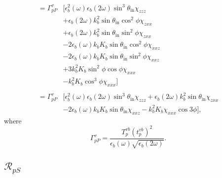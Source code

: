 \begin{equation*}
\begin{split}
= \Gamma^{v}_{pP}&\big[
    \epsilon^{2}_{b}(\omega)\epsilon_{b}
    (2\omega)\sin^{3}\theta_{\mathrm{in}}\chi_{zzz}\\
&+  \epsilon_{b}(2\omega)k^{2}_{b}
    \sin\theta_{\mathrm{in}}\cos^{2}\phi\chi_{zxx}\\
&+  \epsilon_{b}(2\omega)k^{2}_{b}
    \sin\theta_{\mathrm{in}}\sin^{2}\phi\chi_{zxx}\\
&- 2\epsilon_{b}(\omega)k_{b}K_{b}
    \sin\theta_{\mathrm{in}}\cos^{2}\phi\chi_{xxz}\\
&- 2\epsilon_{b}(\omega)k_{b}K_{b}
    \sin\theta_{\mathrm{in}}\sin^{2}\phi\chi_{xxz}\\
&+ 3k^{2}_{b}K_{b}\sin^{2}\phi\cos\phi\chi_{xxx}\\
&-  k^{2}_{b}K_{b}\cos^{3}\phi\chi_{xxx}
\big]\\\\
= \Gamma^{v}_{pP}&\big[
    \epsilon^{2}_{b}(\omega)\epsilon_{b}(2\omega)
    \sin^{3}\theta_{\mathrm{in}}\chi_{zzz}
 +  \epsilon_{b}(2\omega)k^{2}_{b}\sin\theta_{\mathrm{in}}\chi_{zxx}\\
&- 2\epsilon_{b}(\omega)k_{b}K_{b}\sin\theta_{\mathrm{in}}\chi_{xxz}
 -  k^{2}_{b}K_{b}\chi_{xxx}\cos3\phi
\big],
\end{split}
\end{equation*}
where
\begin{equation*}
\Gamma^{v}_{pP} =
\frac{T^{v b}_{p}\left(t^{v b}_{p}\right)^{2}}
     {\epsilon_{b}(\omega)\sqrt{\epsilon_{b}(2\omega)}}.
\end{equation*}


\subsection{\texorpdfstring{$\mathcal{R}_{pS}$}{RpS}}


